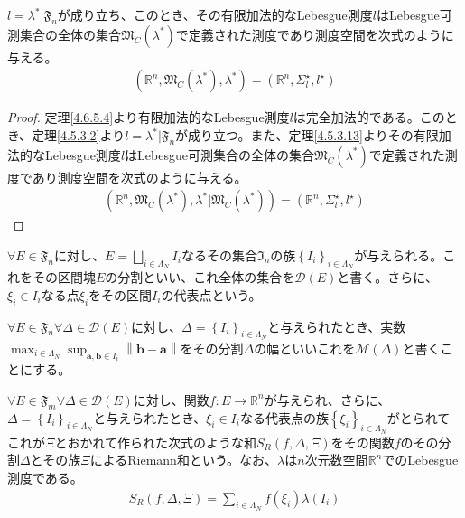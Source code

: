 \documentclass[dvipdfmx]{jsarticle}
\begin{document}
\begin{thm}\label{4.6.5.5}
$l = \lambda^{*}|\mathfrak{F}_{n}$が成り立ち、このとき、その有限加法的なLebesgue測度$l$はLebesgue可測集合の全体の集合$\mathfrak{M}_{C}\left( \lambda^{*} \right)$で定義された測度であり測度空間を次式のように与える。
\begin{align*}
\left( \mathbb{R}^{n},\mathfrak{M}_{C}\left( \lambda^{*} \right),\lambda^{*} \right) = \left( \mathbb{R}^{n},\varSigma_{l}^{\star},l^{\star} \right)
\end{align*}
\end{thm}
\begin{proof} 定理\ref{4.6.5.4}より有限加法的なLebesgue測度$l$は完全加法的である。このとき、定理\ref{4.5.3.2}より$l = \lambda^{*}|\mathfrak{F}_{n}$が成り立つ。また、定理\ref{4.5.3.13}よりその有限加法的なLebesgue測度$l$はLebesgue可測集合の全体の集合$\mathfrak{M}_{C}\left( \lambda^{*} \right)$で定義された測度であり測度空間を次式のように与える。
\begin{align*}
\left( \mathbb{R}^{n},\mathfrak{M}_{C}\left( \lambda^{*} \right),\lambda^{*}|\mathfrak{M}_{C}\left( \lambda^{*} \right) \right) = \left( \mathbb{R}^{n},\varSigma_{l}^{\star},l^{\star} \right)
\end{align*}
\end{proof}
\begin{dfn}
$\forall E \in \mathfrak{F}_{n}$に対し、$E = \bigsqcup_{i \in \varLambda_{N}} I_{i}$なるその集合$\mathfrak{I}_{n}$の族$\left\{ I_{i} \right\}_{i \in \varLambda_{N} }$が与えられる。これをその区間塊$E$の分割といい、これ全体の集合を$\mathcal{D}(E)$と書く。さらに、$\xi_{i} \in I_{i}$なる点$\xi_{i}$をその区間$I_{i}$の代表点という。
\end{dfn}
\begin{dfn}
$\forall E \in \mathfrak{F}_{n}\forall\varDelta \in \mathcal{D}(E)$に対し、$\varDelta = \left\{ I_{i} \right\}_{i \in \varLambda_{N} }$と与えられたとき、実数$\max_{i \in \varLambda_{N}}{\sup_{\mathbf{a},\mathbf{b} \in I_{i}}\left\| \mathbf{b} - \mathbf{a} \right\|}$をその分割$\varDelta$の幅といいこれを$\mathcal{M}(\varDelta)$と書くことにする。
\end{dfn}
\begin{dfn}
$\forall E \in \mathfrak{F}_{m}\forall\varDelta \in \mathcal{D}(E)$に対し、関数$f:E \rightarrow \mathbb{R}^{n}$が与えられ、さらに、$\varDelta = \left\{ I_{i} \right\}_{i \in \varLambda_{N}}$と与えられたとき、$\xi_{i} \in I_{i}$なる代表点の族$\left\{ \xi_{i} \right\}_{i \in \varLambda_{N}}$がとられてこれが$\Xi$とおかれて作られた次式のような和$S_{R}(f,\varDelta,\Xi)$をその関数$f$のその分割$\varDelta$とその族$\Xi$によるRiemann和という。なお、$\lambda$は$n$次元数空間$\mathbb{R}^{n}$でのLebesgue測度である。
\begin{align*}
S_{R}(f,\varDelta,\Xi) = \sum_{i \in \varLambda_{N}} {f\left( \xi_{i} \right)\lambda\left( I_{i} \right)}
\end{align*}
\end{dfn}
\end{document}
